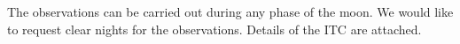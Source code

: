 \documentclass[11pt]{article}
\begin{document}
The observations can be carried out during any phase of the moon. We would like to request clear nights for the observations. Details of the ITC are attached. 
\bigskip



\bandthreeplan    %


\bigskip



\classicalbackup    %


\bigskip


\end{document}
